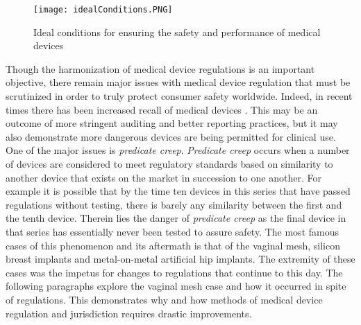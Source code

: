 \documentclass[12pt, openany, oneside]{book}
\begin{document}
\begin{figure}
		\center
		\texttt{[image: idealConditions.PNG]}
	\caption[Regulatory Conditions]{Ideal conditions for ensuring the safety and performance of medical devices \citep{cheng2003}}\label{fig:ideal}
\end{figure}


Though the harmonization of medical device regulations is an important objective, there remain major issues with medical device regulation that must be scrutinized in order to truly protect consumer safety worldwide. Indeed, in recent times there has been increased recall of medical devices \citep{gupta2016medical}. This may be an outcome of more stringent auditing and better reporting practices, but it may also demonstrate more dangerous devices are being permitted for clinical use. One of the major issues is \textit{predicate creep}. \textit{Predicate creep} occurs when a number of devices are considered to meet regulatory standards based on similarity to another device that exists on the market in succession to one another. For example it is possible that by the time ten devices in this series that have passed regulations without testing, there is barely any similarity between the first and the tenth device. Therein lies the danger of \textit{predicate creep} as the final device in that series has essentially never been tested to assure safety. The most famous cases of this phenomenon and its aftermath is that of the vaginal mesh, silicon breast implants and metal-on-metal artificial hip implants. The extremity of these cases was the impetus for changes to regulations that continue to this day. The following paragraphs explore the vaginal mesh case and how it occurred in spite of regulations. This demonstrates why and how methods of medical device regulation and jurisdiction requires drastic improvements.\\
\end{document}
